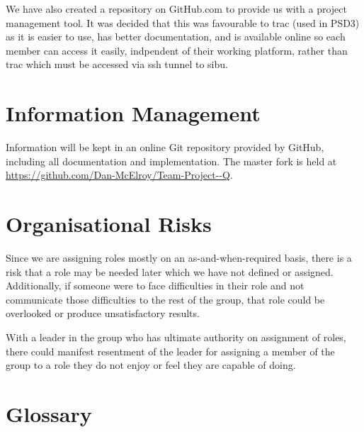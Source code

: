 \documentclass{l3deliverable}
\begin{document}
We have also created a repository on GitHub.com to provide us with a project 
management tool. 
It was decided that this was favourable to trac (used in PSD3) as it is easier
to use, has better documentation, and is available online so each member can
access it easily, indpendent of their working platform, rather than
trac which must be accessed via ssh tunnel to sibu.


\section{Information Management}

Information will be kept in an online Git repository provided by GitHub,
including all documentation and implementation. The master fork is
held at \url{https://github.com/Dan-McElroy/Team-Project--Q}.


\section{Organisational Risks}

Since we are assigning roles mostly on an as-and-when-required basis, there is
a risk that a role may be needed later which we have not defined or assigned.
Additionally, if someone were to face difficulties in their role and not 
communicate those difficulties to the rest of the group, that role could be 
overlooked or produce unsatisfactory results.

With a leader in the group who has ultimate authority on assignment of roles,
there could manifest resentment of the leader for assigning a member of the 
group to a role they do not enjoy or feel they are capable of doing.


\appendix

\section{Glossary}
\end{document}
